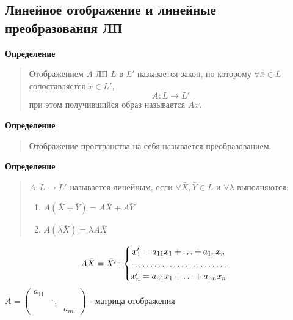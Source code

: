 \documentclass[11pt]{proc}
\begin{document}
\subsection{Линейное отображение и линейные преобразования ЛП}
	\textbf{Определение}
	\begin{quote}
		Отображением $A$ ЛП $L$ в $L'$ называется закон, по которому $\displaystyle\forall\bar{x}\in L$ сопоставляется $\bar{x}\in L'$,
		\[\boxed{A:L\rightarrow L'}\]
		при этом получившийся образ называется $A\bar{x}$.
	\end{quote}
	\textbf{Определение}
	\begin{quote}
		Отображение пространства на себя называется преобразованием.
	\end{quote}
	\textbf{Определение}
	\begin{quote}
		$\displaystyle A:L\rightarrow L'$ называется линейным, если $\displaystyle\forall\bar{X},\bar{Y}\in L$ и $\displaystyle\forall\lambda$ выполняются:
		\begin{enumerate}
			\item{$A(\bar{X}+\bar{Y})=A\bar{X}+A\bar{Y}$}
			\item{$A(\lambda\bar{X})=\lambda A \bar{X}$}
		\end{enumerate}
	\end{quote}
	\pagebreak
	\begin{equation}A\bar{X}=\bar{X'}:
		\begin{cases}
			\begin{matrix}
				x'_1=a_{11}x_1+\ldots+a_{1n}x_n\\
				\hdotsfor{1}\\
				x'_n=a_{n1}x_1+\ldots+a_{nn}x_n
			\end{matrix}
		\end{cases}
	\end{equation}
	$A=\begin{pmatrix}a_{11}& & \\ & \ddots & \\ & & a_{nn}\end{pmatrix}$ - матрица отображения
\end{document}
